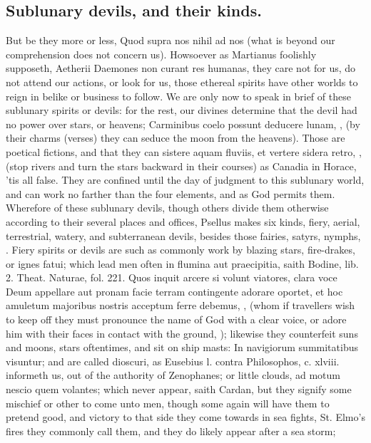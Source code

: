 {\subsection{Sublunary devils, and their kinds.}
But be they more or less, Quod
supra nos nihil ad nos (what is beyond our comprehension does not
concern us). Howsoever as Martianus foolishly supposeth, Aetherii
Daemones non curant res humanas, they care not for us, do not attend
our actions, or look for us, those ethereal spirits have other worlds
to reign in belike or business to follow. We are only now to speak in
brief of these sublunary spirits or devils: for the rest, our divines
determine that the devil had no power over stars, or heavens;
Carminibus coelo possunt deducere lunam, \etc{}, (by their charms
(verses) they can seduce the moon from the heavens). Those are poetical
fictions, and that they can sistere aquam fluviis, et vertere
sidera retro, \etc{}, (stop rivers and turn the stars backward in their
courses) as Canadia in Horace, 'tis all false.  They are confined
until the day of judgment to this sublunary world, and can work no
farther than the four elements, and as God permits them. Wherefore of
these sublunary devils, though others divide them otherwise according
to their several places and offices, Psellus makes six kinds, fiery,
aerial, terrestrial, watery, and subterranean devils, besides those
fairies, satyrs, nymphs, \etc{}.
Fiery spirits or devils are such as commonly work by blazing stars,
fire-drakes, or ignes fatui; which lead men often in flumina aut
praecipitia, saith Bodine, lib. 2. Theat. Naturae, fol. 221. Quos
inquit arcere si volunt viatores, clara voce Deum appellare aut pronam
facie terram contingente adorare oportet, et hoc amuletum majoribus
nostris acceptum ferre debemus, \etc{}, (whom if travellers wish to keep
off they must pronounce the name of God with a clear voice, or adore
him with their faces in contact with the ground, \etc{}); likewise they
counterfeit suns and moons, stars oftentimes, and sit on ship masts: In
navigiorum summitatibus visuntur; and are called dioscuri, as Eusebius
l. contra Philosophos, c. xlviii. informeth us, out of the authority of
Zenophanes; or little clouds, ad motum nescio quem volantes; which
never appear, saith Cardan, but they signify some mischief or other to
come unto men, though some again will have them to pretend good, and
victory to that side they come towards in sea fights, St. Elmo's fires
they commonly call them, and they do likely appear after a sea storm;
}
